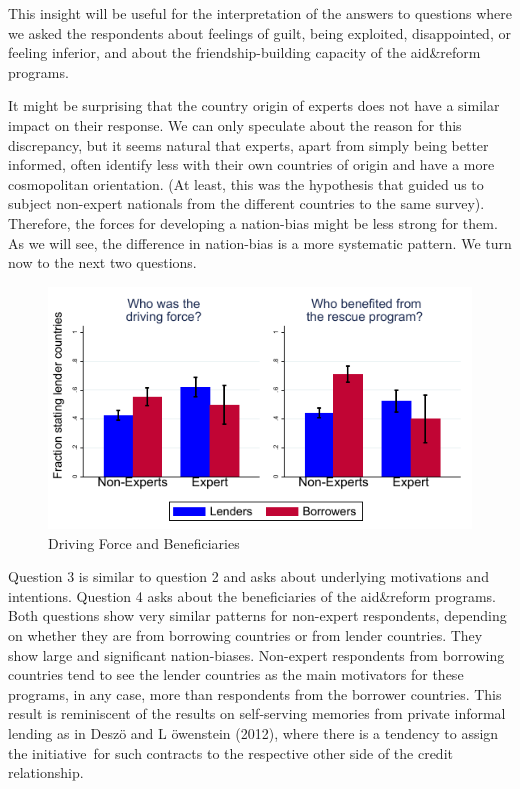 This insight will be useful for the
interpretation of the answers to questions where we asked the respondents
about feelings of guilt, being exploited, disappointed, or feeling inferior,
and about the friendship-building capacity of the aid\&reform programs.

It might be surprising that the country origin of experts does not have a
similar impact on their response. We can only speculate about the reason for
this discrepancy, but it seems natural that experts, apart from simply being
better informed, often identify less with their own countries of origin and have 
a more cosmopolitan orientation. (At
least, this was the hypothesis that guided us to subject non-expert
nationals from the different countries to the same survey). Therefore, the
forces for developing a nation-bias might be less strong for them. As we
will see, the difference in nation-bias is a more systematic pattern. We
turn now to the next two questions.

\begin{figure}
    \centering
      \caption{Driving Force and Beneficiaries}
    \includegraphics[scale=1.2]{graph3.pdf}
  
    \label{fig:my_label}
\end{figure}
Question 3 is similar to question 2 and asks about underlying motivations
and intentions. Question 4 asks about the beneficiaries of the aid\&reform
programs. Both questions show very similar patterns for non-expert
respondents, depending on whether they are from borrowing countries or from
lender countries. They show large and significant nation-biases. Non-expert respondents
from borrowing countries tend to see the lender countries as the main
motivators for these programs, in any case, more than respondents from the
borrower countries. This result is reminiscent of the results on
self-serving memories from private informal lending as in Desz\"{o} and L%
\"{o}wenstein (2012), where there is a tendency to assign the initiative\
for such contracts to the respective other side of the credit relationship. 


